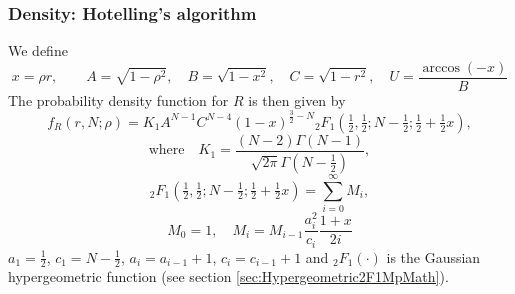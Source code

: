 \subsubsection{Density: Hotelling's algorithm}
\label{rhoDistributionDensity}

We define
\begin{equation}  \label{eq:PearsonRho_Def_ABCU}
	x = \rho r,\quad \quad  A=\sqrt{1-\rho^2}, \quad B=\sqrt{1-x^2}, \quad C=\sqrt{1-r^2}, \quad U=\frac{\arccos(-x)}{B}
\end{equation}
The probability density function for $R$ is then given by \citep{hotelling_1953}
\begin{equation} \label{eq:PearsonRho_PDF_Ik_def}
	f_R(r, N; \rho) = K_1 A^{N-1} C^{N-4} (1-x)^{\tfrac{3}{2}-N}{}_2F_1\left(\tfrac{1}{2},\tfrac{1}{2}; N-\tfrac{1}{2}; \tfrac{1}{2}+\tfrac{1}{2}x\right),
\end{equation}
\begin{equation}  \label{eq:PearsonRho_K1}
	\text{where}  \quad  K_1 = \frac{(N-2)\Gamma(N-1)}{\sqrt{2\pi}\Gamma\left(N-\tfrac{1}{2}\right)},  
\end{equation}
\begin{equation}  \label{eq:PearsonRho_T1}
	{}_2F_1\left(\tfrac{1}{2},\tfrac{1}{2}; N-\tfrac{1}{2}; \tfrac{1}{2}+\tfrac{1}{2}x\right) =  \sum_{i=0}^{\infty} M_i,
\end{equation}
\begin{equation} 
	M_0= 1, \quad M_i = M_{i-1} \frac{a_i^2}{c_i} \frac{1+x}{2i}
\end{equation}
$a_1=\tfrac{1}{2}$, $c_1 = N-\tfrac{1}{2}$, $a_i=a_{i-1}+1$, $c_i=c_{i-1}+1$ and ${}_2F_1(\cdot)$ is the Gaussian hypergeometric function (see section \ref{sec:Hypergeometric2F1MpMath}).


